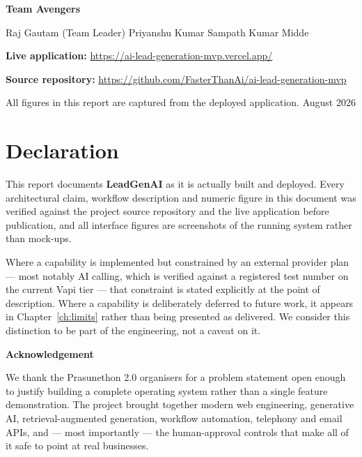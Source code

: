\documentclass[11pt,a4paper]{report}
\newcommand{\project}{\textbf{LeadGenAI}}
\begin{document}
\begin{titlepage}
\begin{center}
  \vfill
  {\large\bfseries Team Avengers\par}
  \vspace{0.2cm}
  {\normalsize Raj Gautam (Team Leader) \quad\textbullet\quad Priyanshu Kumar \quad\textbullet\quad Sampath Kumar Midde\par}
  \vspace{0.35cm}
  {\small\textbf{Live application:} \url{https://ai-lead-generation-mvp.vercel.app/}\par}
  {\small\textbf{Source repository:} \url{https://github.com/FasterThanAi/ai-lead-generation-mvp}\par}
  \vspace{0.25cm}
  {\footnotesize\color{graytext} All figures in this report are captured from the deployed application. \quad August 2026\par}
\end{center}
\end{titlepage}


\chapter*{Declaration}
This report documents \project{} as it is actually built and deployed. Every architectural claim, workflow description and numeric figure in this document was verified against the project source repository and the live application before publication, and all interface figures are screenshots of the running system rather than mock-ups.

Where a capability is implemented but constrained by an external provider plan --- most notably AI calling, which is verified against a registered test number on the current Vapi tier --- that constraint is stated explicitly at the point of description. Where a capability is deliberately deferred to future work, it appears in Chapter~\ref{ch:limits} rather than being presented as delivered. We consider this distinction to be part of the engineering, not a caveat on it.

\vspace{14pt}
{\sffamily\Large\bfseries\color{navy}Acknowledgement}
\vspace{4pt}

We thank the Prasunethon 2.0 organisers for a problem statement open enough to justify building a complete operating system rather than a single feature demonstration. The project brought together modern web engineering, generative AI, retrieval-augmented generation, workflow automation, telephony and email APIs, and --- most importantly --- the human-approval controls that make all of it safe to point at real businesses.
\end{document}
